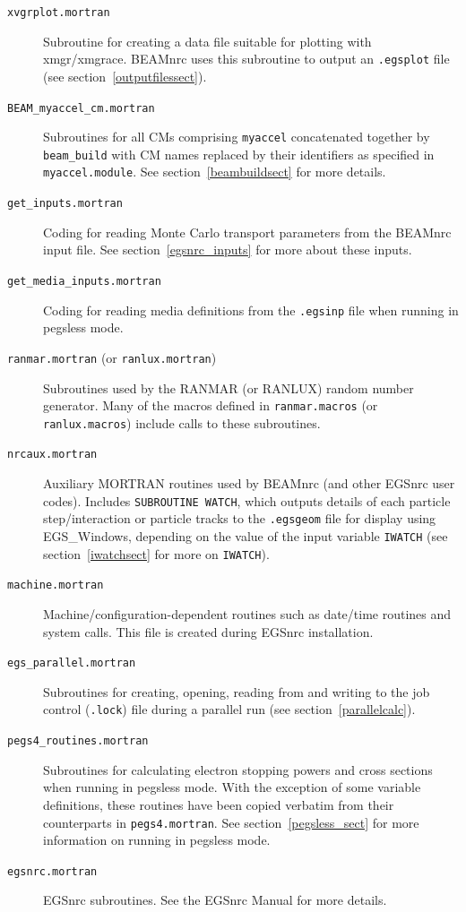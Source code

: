 \documentclass[12pt,twoside]{article}
\begin{document}
\begin{description}
\item [{\tt xvgrplot.mortran}] Subroutine for creating a data file
suitable for plotting with xmgr/xmgrace.  BEAMnrc uses this
subroutine to output an {\tt .egsplot} file (see section~\ref{outputfilessect}).
\item [{\tt BEAM\_myaccel\_cm.mortran}]  Subroutines for all
CMs comprising {\tt myaccel} concatenated together by {\tt beam\_build}
with CM names replaced by their identifiers as specified in
{\tt myaccel.module}.  See section~\ref{beambuildsect} for more details.
\item [{\tt get\_inputs.mortran}] Coding for reading Monte Carlo transport parameters from
the BEAMnrc input file.  See section~\ref{egsnrc_inputs} for more about these
inputs.
\item[{\tt get\_media\_inputs.mortran}]  Coding for reading media definitions from the
{\tt .egsinp} file when running in pegsless mode.
\item [{\tt ranmar.mortran} (or {\tt ranlux.mortran})] Subroutines used
by the RANMAR (or RANLUX) random number generator.  Many of the
macros defined in {\tt ranmar.macros} (or {\tt ranlux.macros}) include
calls to these subroutines.
\item [{\tt nrcaux.mortran}] Auxiliary MORTRAN routines used by
BEAMnrc (and other EGSnrc user codes).  Includes
{\tt SUBROUTINE WATCH}, which outputs details of each
particle step/interaction or particle tracks to the {\tt .egsgeom} file
for display using EGS\_Windows, depending on the value of the
input variable {\tt IWATCH} (see section~\ref{iwatchsect} for more
on {\tt IWATCH}).
\item [{\tt machine.mortran}]  Machine/configuration-dependent routines
such as date/time routines and system calls.  This file is created during
EGSnrc installation.
\item [{\tt egs\_parallel.mortran}] Subroutines for creating, opening,
reading from and writing to the job control ({\tt .lock}) file
during a parallel run (see section~\ref{parallelcalc}).
\item [{\tt pegs4\_routines.mortran}] Subroutines for calculating electron
stopping powers and cross sections when running in pegsless mode.  With the
exception of some variable definitions, these routines have been copied verbatim
from their counterparts in {\tt pegs4.mortran}.  See section~\ref{pegsless_sect}
for more information on running in pegsless mode.
\item [{\tt egsnrc.mortran}] EGSnrc subroutines.  See the EGSnrc
Manual\cite{KR03} for more details.
\end{description}
\end{document}

